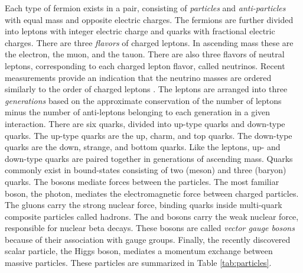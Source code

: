 Each type of fermion exists in a pair, consisting of \emph{particles} and \emph{anti-particles} with equal mass and opposite electric charges.
The fermions are further divided into leptons with integer electric charge and quarks with fractional electric charges.
There are three \emph{flavors} of charged leptons. In ascending mass these are the electron, the muon, and the tauon.
There are also three flavors of neutral leptons, corresponding to each charged lepton flavor, called neutrinos.
Recent measurements provide an indication that the neutrino masses are ordered similarly to the order of charged leptons \cite{kamio}.
The leptons are arranged into three \emph{generations} based on the approximate conservation of the number of leptons minus the number of anti-leptons belonging to each generation in a given interaction.
There are six quarks, divided into up-type quarks and down-type quarks.
The up-type quarks are the up, charm, and top quarks.
The down-type quarks are the down, strange, and bottom quarks.
Like the leptons, up- and down-type quarks are paired together in generations of ascending mass.
Quarks commonly exist in bound-states consisting of two (meson) and three (baryon) quarks.
The bosons mediate forces between the particles.
The most familiar boson, the photon, mediates the electromagnetic force between charged particles.
The gluons carry the strong nuclear force, binding quarks inside multi-quark composite particles called hadrons.
The \W and \Z bosons carry the weak nuclear force, responsible for nuclear beta decays.
These bosons are called \emph{vector gauge bosons} because of their association with gauge groups.
Finally, the recently discovered scalar particle, the Higgs boson, mediates a momentum exchange between massive particles.
These particles are summarized in Table \ref{tab:particles}.

